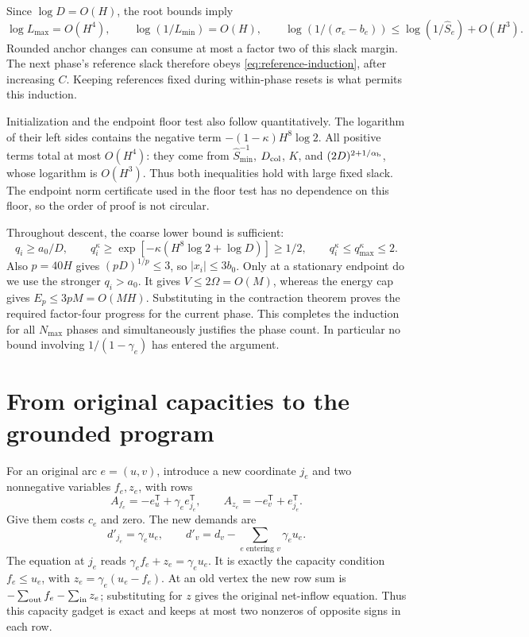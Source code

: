 \documentclass[11pt]{article}
\theoremstyle{definition}\newtheorem{definition}[theorem]{Definition}
\theoremstyle{remark}\newtheorem{remark}[theorem]{Remark}
\begin{document}
Since $\log D=O(H)$, the root bounds imply
\[
 \log L_{\max}=O(H^4),\qquad
 \log(1/L_{\min})=O(H),\qquad
 \log(1/(\sigma_e-b_e))
 \le\log(1/\widehat S_e)+O(H^3).
\]
Rounded anchor changes can consume at most a factor two of this slack
margin. The next phase's reference slack therefore obeys
\eqref{eq:reference-induction}, after increasing $C$. Keeping references
fixed during within-phase resets is what permits this induction.

Initialization and the endpoint floor test also follow quantitatively.
The logarithm of their left sides contains the negative term
$-(1-\kappa)H^8\log2$. All positive terms total at most $O(H^4)$:
they come from $\widehat S_{\min}^{-1}$, $D_{\rm col}$, $K$, and
$(2D)^{2+1/\alpha_{\rm b}}$, whose logarithm is $O(H^3)$.
Thus both inequalities hold with large fixed slack. The endpoint norm
certificate used in the floor test has no dependence on this floor,
so the order of proof is not circular.

Throughout descent, the coarse lower bound is sufficient:
\[
 q_i\ge a_0/D,\qquad
 q_i^\kappa\ge\exp[-\kappa(H^8\log2+\log D)]\ge1/2,
 \qquad q_i^\kappa\le q_{\max}^\kappa\le2.
\]
Also $p=40H$ gives $(pD)^{1/p}\le3$, so $|x_i|\le3b_0$.
Only at a stationary endpoint do we use the stronger $q_i>a_0$.
It gives $V\le2\Omega=O(M)$, whereas the energy cap gives
$E_p\le3pM=O(MH)$. Substituting in the contraction theorem proves
the required factor-four progress for the current phase. This completes
the induction for all $N_{\max}$ phases and simultaneously justifies
the phase count. In particular no bound involving $1/(1-\gamma_e)$
has entered the argument.



\section{From original capacities to the grounded program}\label{app:reduction}

For an original arc $e=(u,v)$, introduce a new coordinate $j_e$ and two
nonnegative variables $f_e,z_e$, with rows
\[
 A_{f_e}=-e_u^{\mathsf T}+\gamma_e e_{j_e}^{\mathsf T},\qquad
 A_{z_e}=-e_v^{\mathsf T}+e_{j_e}^{\mathsf T}.
\]
Give them costs $c_e$ and zero. The new demands are
\[
 d'_{j_e}=\gamma_eu_e,\qquad
 d'_v=d_v-\sum_{e\text{ entering }v}\gamma_eu_e.
\]
The equation at $j_e$ reads $\gamma_ef_e+z_e=\gamma_eu_e$.
It is exactly the capacity condition $f_e\le u_e$, with
$z_e=\gamma_e(u_e-f_e)$. At an old vertex the new row sum is
$-\sum_{\rm out}f_e-\sum_{\rm in}z_e$; substituting for $z$ gives
the original net-inflow equation. Thus this capacity gadget is exact
and keeps at most two nonzeros of opposite signs in each row.
\end{document}
